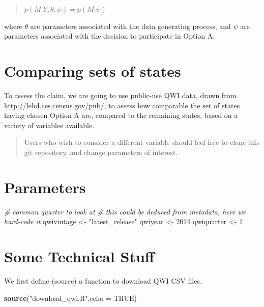 \documentclass[]{article}
\newenvironment{Shaded}{\begin{snugshade}}{\end{snugshade}}
\newcommand{\KeywordTok}[1]{\textcolor[rgb]{0.13,0.29,0.53}{\textbf{{#1}}}}
\newcommand{\DataTypeTok}[1]{\textcolor[rgb]{0.13,0.29,0.53}{{#1}}}
\newcommand{\DecValTok}[1]{\textcolor[rgb]{0.00,0.00,0.81}{{#1}}}
\newcommand{\StringTok}[1]{\textcolor[rgb]{0.31,0.60,0.02}{{#1}}}
\newcommand{\CommentTok}[1]{\textcolor[rgb]{0.56,0.35,0.01}{\textit{{#1}}}}
\newcommand{\OtherTok}[1]{\textcolor[rgb]{0.56,0.35,0.01}{{#1}}}
\newcommand{\NormalTok}[1]{{#1}}
\begin{document}
\begin{quote}
\(p(M | Y, \theta, \psi) = p(M|\psi)\)
\end{quote}

where \(\theta\) are parameters associated with the data generating
process, and \(\psi\) are parameters associated with the decision to
participate in Option A.

\section{Comparing sets of states}\label{comparing-sets-of-states}

To assess the claim, we are going to use public-use QWI data, drawn from
\url{http://lehd.ces.census.gov/pub/}, to assess how comparable the set
of states having chosen Option A are, compared to the remaining states,
based on a variety of variables available.

\begin{quote}
Users who wish to consider a different variable should feel free to
clone this git repository, and change parameters of interest.
\end{quote}

\section{Parameters}\label{parameters}

\begin{Shaded}
\begin{Highlighting}[]
\CommentTok{# common quarter to look at}
\CommentTok{# this could be deduced from metadata, here we hard-code it}
\NormalTok{qwivintage <-}\StringTok{ "latest_release"}
\NormalTok{qwiyear    <-}\StringTok{ }\DecValTok{2014}
\NormalTok{qwiquarter <-}\StringTok{ }\DecValTok{1}
\end{Highlighting}
\end{Shaded}

\section{Some Technical Stuff}\label{some-technical-stuff}

We first define (source) a function to download QWI CSV files.

\begin{Shaded}
\begin{Highlighting}[]
\KeywordTok{source}\NormalTok{(}\StringTok{"download_qwi.R"}\NormalTok{,}\DataTypeTok{echo =} \OtherTok{TRUE}\NormalTok{)}
\end{Highlighting}
\end{Shaded}
\end{document}
